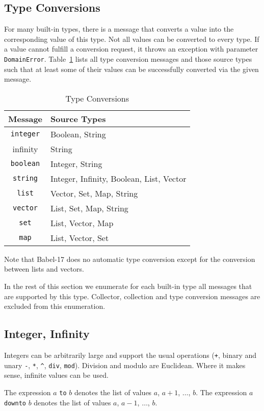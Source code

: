 \documentclass[11pt]{amsart}
\newcommand{\babelsrc}[1] {\lstinline!#1!}
\begin{document}
\subsection{Type Conversions}
For many built-in types, there is a message that converts a value into the corresponding value of this type. Not all values can be converted to every type. If a value cannot fulfill a conversion request, it throws an exception with parameter \babelsrc{DomainError}. Table~\ref{tab:typeconversions} lists all type conversion messages and those source types such that at least some of their values can be successfully converted via the given message.
\begin{table}
\caption{Type Conversions}
\begin{tabular}{c|l}
\textbf{Message} & \textbf{Source Types} \\\hline
\babelsrc{integer} & Boolean, String \\
infinity & String \\
\babelsrc{boolean} & Integer, String \\
\babelsrc{string} & Integer, Infinity, Boolean, List, Vector \\
\babelsrc{list} &  Vector, Set, Map, String \\
\babelsrc{vector} & List, Set, Map, String \\
\babelsrc{set} & List, Vector, Map \\
\babelsrc{map} & List, Vector, Set \\
\end{tabular}
\label{tab:typeconversions}
\end{table}
Note that Babel-17 does no automatic type conversion except for the conversion between lists and vectors.

In the rest of this section we enumerate for each built-in type all messages that are supported by this type. Collector, collection and type conversion messages are excluded from this enumeration.

\subsection{Integer, Infinity}
Integers can be arbitrarily large and support the usual operations (\texttt{+}, binary and unary \texttt{-}, \texttt{*}, \texttt{\^}, \babelsrc{div}, \babelsrc{mod}). Division and modulo are Euclidean. Where it makes sense, infinite values can be used. 

The expression $a$ \texttt{to} $b$ denotes the list of values $a$, $a+1$, $\ldots$, $b$. The expression $a$  \texttt{downto} $b$ denotes the list of values  $a$, $a-1$, $\ldots$, $b$. 
\end{document}
